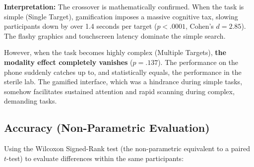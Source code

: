 \documentclass[11pt,a4paper]{article}
\begin{document}
\begin{table}[htbp]
\centering
\caption{Paired-samples $t$-tests: Phone (Game) vs.\ Lab RT.}
\label{tab:ttest_rq3}
\end{table}

\textbf{Interpretation:} The crossover is mathematically confirmed. When the task is simple (Single Target), gamification imposes a massive cognitive tax, slowing participants down by over 1.4 seconds per target ($p < .0001$, Cohen's $d=2.85$). The flashy graphics and touchscreen latency dominate the simple search. 

However, when the task becomes highly complex (Multiple Targets), \textbf{the modality effect completely vanishes} ($p = .137$). The performance on the phone suddenly catches up to, and statistically equals, the performance in the sterile lab. The gamified interface, which was a hindrance during simple tasks, somehow facilitates sustained attention and rapid scanning during complex, demanding tasks.

\subsection{Accuracy (Non-Parametric Evaluation)}
Using the Wilcoxon Signed-Rank test (the non-parametric equivalent to a paired $t$-test) to evaluate differences within the same participants:

\begin{table}[htbp]
\centering
\caption{Wilcoxon Signed-Rank tests: Game vs.\ Lab Accuracy.}
\label{tab:wilcoxon}
\end{table}
\end{document}
